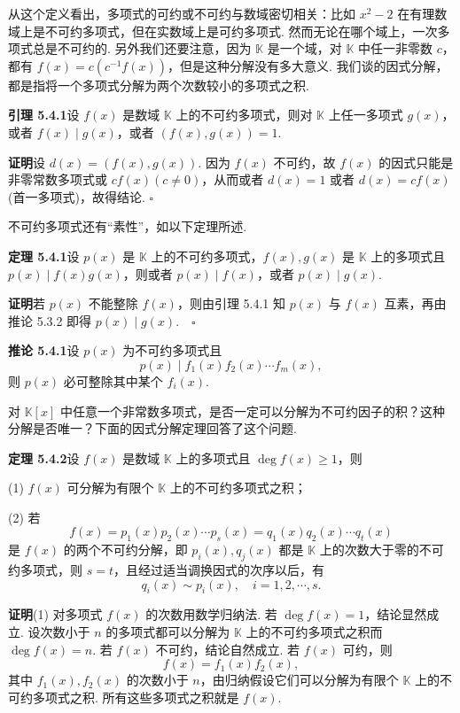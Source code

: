 \documentclass[UTF8, 12pt, fontset=fandol, oneside]{ctexart}
\begin{document}
从这个定义看出，多项式的可约或不可约与数域密切相关：比如 $x^2-2$ 在有理数域上是不可约多项式，但在实数域上是可约多项式. 然而无论在哪个域上，一次多项式总是不可约的. 另外我们还要注意，因为 $\mathbb{K}$ 是一个域，对 $\mathbb{K}$ 中任一非零数 $c$，都有 $f(x)=c(c^{-1}f(x))$，但是这种分解没有多大意义. 我们谈的因式分解，都是指将一个多项式分解为两个次数较小的多项式之积.

\noindent\textbf{引理 5.4.1}\quad 设 $f(x)$ 是数域 $\mathbb{K}$ 上的不可约多项式，则对 $\mathbb{K}$ 上任一多项式 $g(x)$，或者 $f(x)\mid g(x)$，或者 $(f(x),g(x))=1$.

\noindent\textbf{证明}\quad 设 $d(x)=(f(x),g(x))$. 因为 $f(x)$ 不可约，故 $f(x)$ 的因式只能是非零常数多项式或 $cf(x)(c\neq 0)$，从而或者 $d(x)=1$ 或者 $d(x)=cf(x)$ (首一多项式)，故得结论. $\square$

不可约多项式还有“素性”，如以下定理所述.

\noindent\textbf{定理 5.4.1}\quad 设 $p(x)$ 是 $\mathbb{K}$ 上的不可约多项式，$f(x),g(x)$ 是 $\mathbb{K}$ 上的多项式且 $p(x)\mid f(x)g(x)$，则或者 $p(x)\mid f(x)$，或者 $p(x)\mid g(x)$.

\noindent\textbf{证明}\quad 若 $p(x)$ 不能整除 $f(x)$，则由引理 5.4.1 知 $p(x)$ 与 $f(x)$ 互素，再由推论 5.3.2 即得 $p(x)\mid g(x).\quad \square$

\noindent\textbf{推论 5.4.1}\quad 设 $p(x)$ 为不可约多项式且
\[
p(x)\mid f_1(x)f_2(x)\cdots f_m(x),
\]
则 $p(x)$ 必可整除其中某个 $f_i(x)$.

对 $\mathbb{K}[x]$ 中任意一个非常数多项式，是否一定可以分解为不可约因子的积？这种分解是否唯一？下面的因式分解定理回答了这个问题.

\noindent\textbf{定理 5.4.2}\quad 设 $f(x)$ 是数域 $\mathbb{K}$ 上的多项式且 $\deg f(x)\geq 1$，则

(1) $f(x)$ 可分解为有限个 $\mathbb{K}$ 上的不可约多项式之积；

(2) 若
\begin{equation}
f(x)=p_1(x)p_2(x)\cdots p_s(x)=q_1(x)q_2(x)\cdots q_t(x)
\tag{5.4.1}
\end{equation}
是 $f(x)$ 的两个不可约分解，即 $p_i(x),q_j(x)$ 都是 $\mathbb{K}$ 上的次数大于零的不可约多项式，则 $s=t$，且经过适当调换因式的次序以后，有
\[
q_i(x)\sim p_i(x),\quad i=1,2,\cdots,s.
\]

\noindent\textbf{证明}\quad (1) 对多项式 $f(x)$ 的次数用数学归纳法. 若 $\deg f(x)=1$，结论显然成立. 设次数小于 $n$ 的多项式都可以分解为 $\mathbb{K}$ 上的不可约多项式之积而 $\deg f(x)=n$. 若 $f(x)$ 不可约，结论自然成立. 若 $f(x)$ 可约，则
\[
f(x)=f_1(x)f_2(x),
\]
其中 $f_1(x),f_2(x)$ 的次数小于 $n$，由归纳假设它们可以分解为有限个 $\mathbb{K}$ 上的不可约多项式之积. 所有这些多项式之积就是 $f(x)$.
\end{document}
